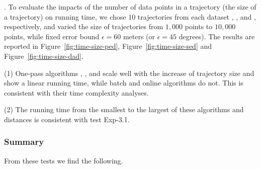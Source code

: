 .
To evaluate the impacts of the number of data points in a trajectory (\ie the size of a trajectory) on running time,
we chose $10$ trajectories from each dataset \taxi, \ucar, \geolife and \mopsi, respectively,
and varied the size  of trajectories from $1,000$ points to $10,000$ points, while fixed error bound $\epsilon = 60$ meters ({or $\epsilon = 45$ degrees}).
The results are reported in Figure~\ref{fig:time-size-ped}, Figure~\ref{fig:time-size-sed} and Figure~\ref{fig:time-size-dad}.

\sstab(1) One-pass algorithms \siped, \operb, \cised and \interval scale well with the increase of trajectory size  and show a linear running time, while batch and online algorithms do not.
This is consistent with their time complexity analyses.

\sstab(2) The running time from the smallest to the largest of these algorithms and distances is consistent with test {Exp-3.1}.





\subsubsection{Summary}
From these tests we find the following.

